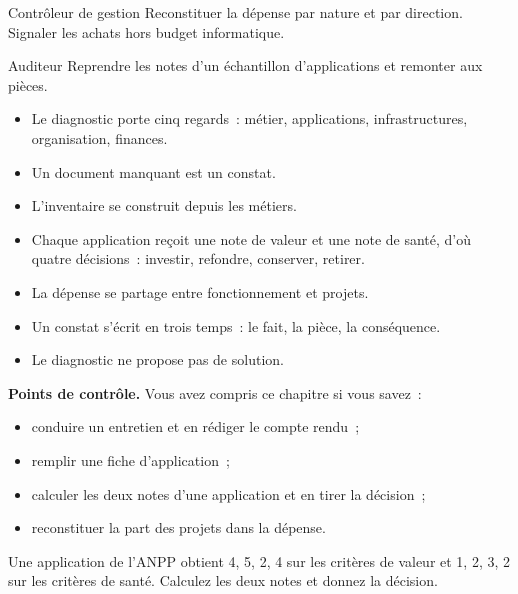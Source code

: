 \begin{boxmetier}{Contrôleur de gestion}
Reconstituer la dépense par nature et par direction. Signaler les achats hors budget informatique.
\end{boxmetier}

\begin{boxmetier}{Auditeur}
Reprendre les notes d'un échantillon d'applications et remonter aux pièces.
\end{boxmetier}

\begin{boxresume}
\begin{itemize}
    \item Le diagnostic porte cinq regards~: métier, applications, infrastructures, organisation, finances.
    \item Un document manquant est un constat.
    \item L'inventaire se construit depuis les métiers.
    \item Chaque application reçoit une note de valeur et une note de santé, d'où quatre décisions~: investir, refondre, conserver, retirer.
    \item La dépense se partage entre fonctionnement et projets.
    \item Un constat s'écrit en trois temps~: le fait, la pièce, la conséquence.
    \item Le diagnostic ne propose pas de solution.
\end{itemize}
\end{boxresume}

\begin{boxinfo}
\textbf{Points de contrôle.} Vous avez compris ce chapitre si vous savez~:
\begin{itemize}
    \item conduire un entretien et en rédiger le compte rendu~;
    \item remplir une fiche d'application~;
    \item calculer les deux notes d'une application et en tirer la décision~;
    \item reconstituer la part des projets dans la dépense.
\end{itemize}
\end{boxinfo}

\begin{boxexo}[title={\ding{45}\quad Exercice~9.1. Deux notes \niveaubase}]
Une application de l'ANPP obtient 4, 5, 2, 4 sur les critères de valeur et 1, 2, 3, 2 sur les critères de santé. Calculez les deux notes et donnez la décision.
\end{boxexo}

